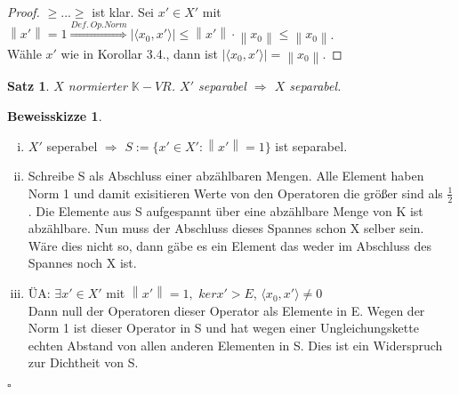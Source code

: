 \documentclass[ngerman]{report}
\theoremstyle{plain}%
\newtheorem{thm}{Satz}[chapter]
\theoremstyle{definition}%
\theoremstyle{myStyle}
\newtheorem*{proof*}{Beweisskizze}
\newenvironment{hinweise}{\footnotesize \begin{proof*}}{\hfill $\square$ \end{proof*}\normalsize}
\newcommand{\K}{\mathbb{K}}
\newcommand{\norm}[1]{\left \|#1\right\| }
\newcommand{\df}[1][]{%
	\overset{#1}{\Rightarrow}
}
\newcommand{\set}[1]{\{#1\}} %
\newcommand{\f}[2]{\langle #1,#2 \rangle} %
\begin{document}
	\begin{proof}
	$\geq...\geq$ ist klar. Sei $x' \in X'$ mit $\norm{x'}=1 \overset{Def.~Op.Norm}{\Longrightarrow} |\f{x_0}{x'}| \leq \norm{x'}\cdot\norm{x_0}\leq \norm{x_0}$.\\
	Wähle $x'$ wie in Korollar 3.4., dann ist $|\f{x_0}{x'}|=\norm{x_0}$.
	\end{proof}

	\begin{thm}
	$X$ normierter $\K-VR$. $X'$ separabel $\df$ $X$ separabel.
	\end{thm}

	\begin{hinweise}
		\begin{enumerate}[(i)]
			\item $X'$ seperabel $\df$ $S := \set{x' \in X': \norm{x'} = 1}$ ist separabel.
			\item Schreibe S als Abschluss einer abzählbaren Mengen. Alle Element haben Norm 1 und damit exisitieren Werte von den Operatoren die größer sind als $\frac{1}{2}$. Die Elemente aus S aufgespannt über eine abzählbare Menge von K ist abzählbare. Nun muss der Abschluss dieses Spannes schon X selber sein. 
			Wäre dies nicht so, dann gäbe es ein Element das weder im Abschluss des Spannes noch X ist.
			\item ÜA: $\exists x' \in X'$ mit $\norm{x'} = 1,$ $ker x' > E$, $\langle x_0, x' \rangle \neq 0$ \\
			Dann null der Operatoren dieser Operator als Elemente in E. Wegen der Norm 1 ist dieser Operator in S und hat wegen einer Ungleichungskette echten Abstand von allen anderen Elementen in S. Dies ist ein Widerspruch zur Dichtheit von S. 
		\end{enumerate}
	\end{hinweise}
\end{document}
